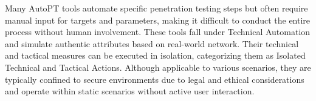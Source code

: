 \begin{itemize}
\end{itemize}


Many AutoPT tools automate specific penetration testing steps but often require manual input for targets and parameters, making it difficult to conduct the entire process without human involvement. These tools fall under Technical Automation and simulate authentic attributes based on real-world network. Their technical and tactical measures can be executed in isolation, categorizing them as Isolated Technical and Tactical Actions. Although applicable to various scenarios, they are typically confined to secure environments due to legal and ethical considerations and operate within static scenarios without active user interaction.


